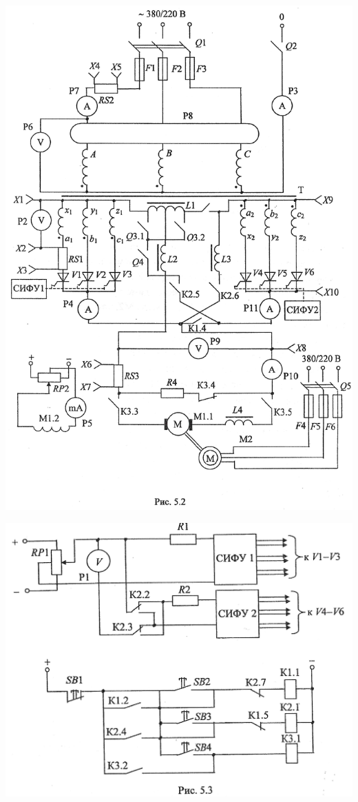 \documentclass[a4paper,14pt]{article}
\begin{document}
\includegraphics[scale=0.75]{ris52a}

\includegraphics[scale=0.75]{ris53a}
\end{document}
